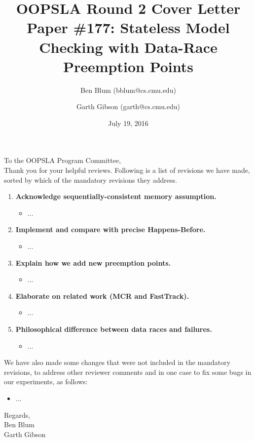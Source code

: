 \documentclass{article}
\title{OOPSLA Round 2 Cover Letter \\ {\large Paper \#177: Stateless Model Checking with Data-Race Preemption Points}}
\author{Ben Blum (\textsf{bblum@cs.cmu.edu}) \and Garth Gibson (\textsf{garth@cs.cmu.edu})}
\date{July 19, 2016}
\begin{document}
\maketitle
\thispagestyle{empty}

\noindent To the OOPSLA Program Committee,
\\

Thank you for your helpful reviews. Following is a list of revisions we have made, sorted by which of the mandatory revisions they address.

\begin{enumerate}
	\item {\bf Acknowledge sequentially-consistent memory assumption.}
	\begin{itemize}
		\item ...
	\end{itemize}
	\item {\bf Implement and compare with precise Happens-Before.}
	\begin{itemize}
		\item ...
	\end{itemize}
	\item {\bf Explain how we add new preemption points.}
	\begin{itemize}
		\item ...
	\end{itemize}
	\item {\bf Elaborate on related work (MCR and FastTrack).}
	\begin{itemize}
		\item ...
	\end{itemize}
	\item {\bf Philosophical difference between data races and failures.}
	\begin{itemize}
		\item ...
	\end{itemize}
\end{enumerate}

We have also made some changes that were not included in the mandatory revisions, to address other reviewer comments and in one case to fix some bugs in our experiments, as follows:

\begin{itemize}
	\item ...
\end{itemize}

\noindent Regards,
\\

\noindent Ben Blum \\
Garth Gibson
\end{document}
